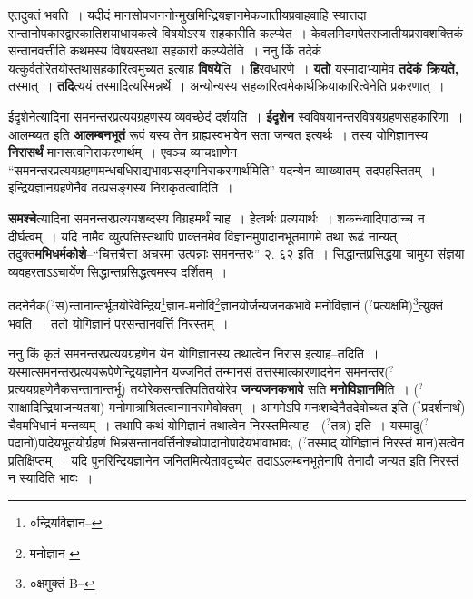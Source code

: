 \documentclass[article,12pt,a4paper]{memoir}
\newcommand{\unclear}[1]{($^{?}$#1)}
\begin{document}
	  \pstart एतदुक्तं भवति । यदीदं मानसोपजननोन्मुखमिन्द्रियज्ञानमेकजातीयप्रवाहवाहि स्यात्तदा सन्तानोपकारद्वारकातिशयाधायकत्वे विषयोऽस्य सहकारीति कल्प्येत । केवलमिदमपेतसजातीयप्रसवशक्तिकं सन्तानवर्त्तीति कथमस्य विषयस्तथा सहकारी कल्प्येतेति । ननु किं तदेकं यत्कुर्वतोरेतयोस्तथासहकारित्वमुच्यत इत्याह \textbf{विषये}ति । \textbf{हि}रवधारणे । \textbf{यतो} यस्मादाभ्यामेव \textbf{तदेकं क्रियते,} तस्मात् । \textbf{तदि}त्ययं तस्मादित्यस्मिन्नर्थे । अन्योन्यस्य सहकारित्वमेकार्थक्रियाकारित्वेनेति प्रकरणात् ।
	\pend
      

	  \pstart ईदृशेनेत्यादिना समनन्तरप्रत्ययग्रहणस्य व्यवच्छेदं दर्शयति । \textbf{ईदृशेन} स्वविषयानन्तरविषयग्रह\leavevmode{}णसहकारिणा । आलम्ब्यत इति \textbf{आलम्बनभूतं} रूपं यस्य तेन ग्राह्यस्वभावेन सता जन्यत इत्यर्थः । तस्य योगिज्ञानस्य \textbf{निरासर्थं} मानसत्वनिराकरणार्थम् । एवञ्च व्याचक्षाणेन “समनन्तरप्रत्ययग्रहणमन्धबधिराद्यभावप्रसङ्गनिराकरणार्थमिति” यदन्येन व्याख्यातम्--तदपहस्तितम् । इन्द्रियज्ञानग्रहणेनैव तत्प्रसङ्गस्य निराकृतत्वादिति ।
	\pend
      

	  \pstart \textbf{समश्चे}त्यादिना समनन्तरप्रत्ययशब्दस्य विग्रहमर्थं चाह । हेत्वर्थः प्रत्ययार्थः । शकन्ध्वादिपाठाच्च न दीर्घत्वम् । यदि नामैवं व्युत्पत्तिस्तथापि प्राक्तनमेव विज्ञानमुपादानभूतमागमे तथा रूढं नान्यत् । तदुक्त\textbf{मभिधर्मकोशे}--“चित्तचैत्ता अचरमा उत्पन्नाः समनन्तरः” \href{http://http://sarit.indology.info/?cref=ak.2.62}{२. ६२} इति । सिद्धान्तप्रसिद्धया चामुया संज्ञया व्यवहरताऽऽचार्येण सिद्धान्तप्रसिद्धत्वमस्य दर्शितम् ।
	\pend
	  \bigskip
	  \begingroup
	

	  \pstart तदनेनैक\unclear{स}न्तानान्तर्भूतयोरेवेन्द्रिय\footnote{०न्द्रियविज्ञान--\cite{dp-msC}}\-ज्ञान-मनोवि\footnote{मनोज्ञान \cite{dp-msA} \cite{dp-msB} \cite{dp-edP} \cite{dp-edH} \cite{dp-edE}}\-ज्ञानयोर्जन्यजनकभावे मनोविज्ञानं \unclear{प्रत्यक्षमि}\footnote{०क्षमुक्तं B--}\-त्युक्तं भवति । ततो योगिज्ञानं परसन्तानवर्त्ति निरस्तम् ।
	\pend
      
	  \endgroup
	

	  \pstart ननु किं कृतं समनन्तरप्रत्ययग्रहणेन येन योगिज्ञानस्य तथात्वेन निरास इत्याह--तदिति । यस्मात्समनन्तरप्रत्ययरूपेणेन्द्रियज्ञानेन यज्जनितं तन्मानसं तत्तस्मात्कारणादनेन समनन्तर\unclear{प्रत्ययग्रहणेनैकसन्तानान्तर्भू} तयोरेकसन्ततिपतितयोरेव \textbf{जन्यजनकभावे} सति \textbf{मनोविज्ञानमि}ति । \unclear{साक्षादिन्द्रियाजन्यतया} मनोमात्राश्रितत्वान्मानसमेवोक्तम् । आगमेऽपि मनःशब्देनैतदेवोच्यत इति \unclear{प्रदर्शनार्थं} चैवमभिधानं मन्तव्यम् । तथापि कथं योगिज्ञानं तथात्वेन निरस्तमित्याह—\unclear{तत्र} इति । यस्मादु\unclear{पदानो}पादेयभूतयोर्ग्रहणं भिन्नसन्तानवर्त्तिनोश्चोपादानोपादेयभावाभावः, \unclear{तस्माद् योगिज्ञानं निरस्तं मान}सत्वेन प्रतिक्षिप्तम् । यदि पुनरिन्द्रियज्ञानेन जनितमित्येतावदुच्येत तदाऽऽलम्बनभूतेनापि तेनादौ जन्यत इति निरस्तं न स्यादिति भावः ।
	\pend
      
\end{document}
